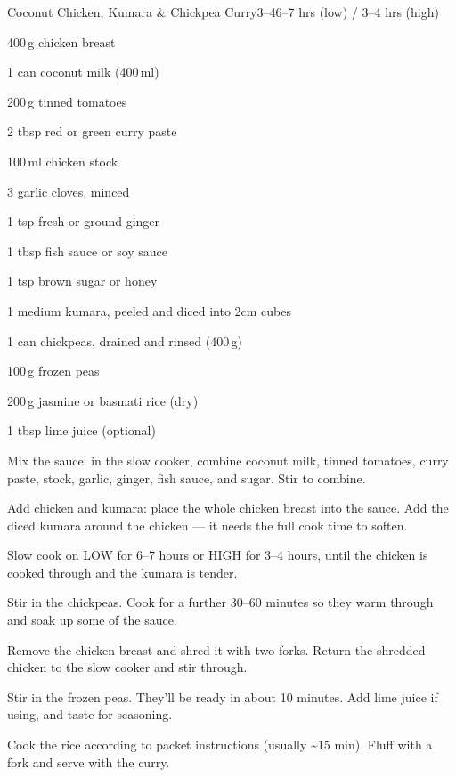 \begin{recipebox}{Coconut Chicken, Kumara \& Chickpea Curry}{3--4}{6--7 hrs (low) / 3--4 hrs (high)}

\begin{ingredients}
  \item 400\,g chicken breast
  \item 1 can coconut milk (400\,ml)
  \item 200\,g tinned tomatoes
  \item 2 tbsp red or green curry paste
  \item 100\,ml chicken stock
  \item 3 garlic cloves, minced
  \item 1 tsp fresh or ground ginger
  \item 1 tbsp fish sauce or soy sauce
  \item 1 tsp brown sugar or honey
  \item 1 medium kumara, peeled and diced into 2cm cubes
  \item 1 can chickpeas, drained and rinsed (400\,g)
  \item 100\,g frozen peas
  \item 200\,g jasmine or basmati rice (dry)
  \item 1 tbsp lime juice (optional)
\end{ingredients}

\begin{method}
  \item Mix the sauce: in the slow cooker, combine coconut milk, tinned tomatoes, curry paste, stock, garlic, ginger, fish sauce, and sugar. Stir to combine.
  \item Add chicken and kumara: place the whole chicken breast into the sauce. Add the diced kumara around the chicken --- it needs the full cook time to soften.
  \item Slow cook on LOW for 6--7 hours or HIGH for 3--4 hours, until the chicken is cooked through and the kumara is tender.
  \item Stir in the chickpeas. Cook for a further 30--60 minutes so they warm through and soak up some of the sauce.
  \item Remove the chicken breast and shred it with two forks. Return the shredded chicken to the slow cooker and stir through.
  \item Stir in the frozen peas. They'll be ready in about 10 minutes. Add lime juice if using, and taste for seasoning.
  \item Cook the rice according to packet instructions (usually \textasciitilde15 min). Fluff with a fork and serve with the curry.
\end{method}


\end{recipebox}
